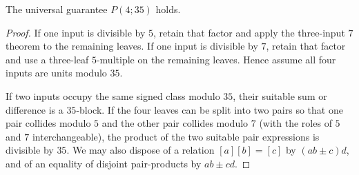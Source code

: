 \begin{theorem}\label{thm:p35}
The universal guarantee $P(4;35)$ holds.
\end{theorem}
\begin{proof}
If one input is divisible by $5$, retain that factor and apply the
three-input $7$ theorem  to the remaining leaves.  If one
input is divisible by $7$, retain that factor and use a three-leaf
$5$-multiple on the remaining leaves.  Hence assume all four inputs are units
modulo $35$.

If two inputs occupy the same signed class modulo $35$, their suitable sum or
difference is a $35$-block.  If the four leaves can be split into two pairs
so that one pair collides modulo $5$ and the other pair collides modulo $7$
(with the roles of $5$ and $7$ interchangeable), the product of the two
suitable pair expressions is divisible by $35$.  We may also dispose of a
relation $[a][b]=[c]$ by $(ab\pm c)d$, and of an equality of disjoint
pair-products by $ab\pm cd$.


\end{proof}
